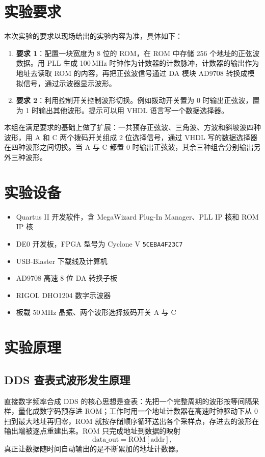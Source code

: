 \documentclass[12pt]{ctexart}
\begin{document}
\section{实验要求}

本次实验的要求以现场给出的实验内容为准，具体如下：

\begin{enumerate}
    \item \textbf{要求 1}：配置一块宽度为 8 位的 ROM，在 ROM 中存储 256 个地址的正弦波数据。用 PLL 生成 100\,MHz 时钟作为计数器的计数脉冲，计数器的输出作为地址去读取 ROM 的内容，再把正弦波信号通过 DA 模块 AD9708 转换成模拟信号，通过示波器显示波形。
    \item \textbf{要求 2}：利用控制开关控制波形切换。例如拨动开关置为 0 时输出正弦波，置为 1 时输出其他波形。提示可以用 VHDL 语言写一个数据选择器。
\end{enumerate}

本组在满足要求的基础上做了扩展：一共预存正弦波、三角波、方波和斜坡波四种波形，用 A 和 C 两个拨码开关组成 2 位选择信号，通过 VHDL 写的数据选择器在四种波形之间切换。当 A 与 C 都置 0 时输出正弦波，其余三种组合分别输出另外三种波形。

\section{实验设备}

\begin{itemize}
    \item Quartus II 开发软件，含 MegaWizard Plug-In Manager、PLL IP 核和 ROM IP 核
    \item DE0 开发板，FPGA 型号为 Cyclone V \texttt{5CEBA4F23C7}
    \item USB-Blaster 下载线及计算机
    \item AD9708 高速 8 位 DA 转换子板
    \item RIGOL DHO1204 数字示波器
    \item 板载 50\,MHz 晶振、两个波形选择拨码开关 A 与 C
\end{itemize}

\section{实验原理}

\subsection{DDS 查表式波形发生原理}

直接数字频率合成 DDS 的核心思想是查表：先把一个完整周期的波形按等间隔采样，量化成数字码预存进 ROM；工作时用一个地址计数器在高速时钟驱动下从 0 扫到最大地址再归零，ROM 就按存储顺序循环送出各个采样点，存进去的波形在输出端被逐点重建出来。ROM 只完成地址到数据的映射
\[
    \mathrm{data\_out} = \mathrm{ROM}[\mathrm{addr}],
\]
真正让数据随时间自动输出的是不断累加的地址计数器。
\end{document}
